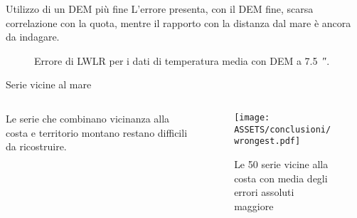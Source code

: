 %     

%     

\begin{frame}{Utilizzo di un DEM più fine}
  L'errore presenta, con il DEM fine, scarsa correlazione con la quota, mentre il rapporto con la distanza dal mare è ancora da indagare.
  \begin{figure}
    \begin{subfigure}{0.45\textwidth}
      

    \end{subfigure}
    \begin{subfigure}{0.45\textwidth}
      
    \end{subfigure}
    \caption*{Errore di LWLR per i dati di temperatura media con DEM a \qty{7.5}{\arcsecond}.}
  \end{figure}
\end{frame}

\begin{frame}{Serie vicine al mare}
  \begin{columns}
    \begin{column}{0.5\textwidth}
      Le serie che combinano vicinanza alla costa e territorio montano restano difficili da ricostruire.
    \end{column}
    \begin{column}{0.5\textwidth}
      \begin{figure}
        \texttt{[image: ASSETS/conclusioni/wrongest.pdf]}
        \caption*{Le 50 serie vicine alla costa con media degli errori assoluti maggiore}
      \end{figure}
    \end{column}
  \end{columns}

\end{frame}
